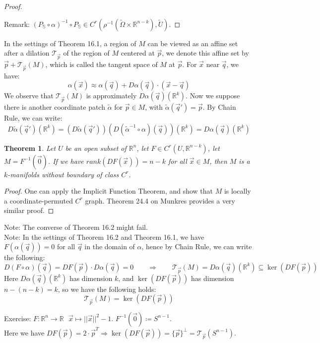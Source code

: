 \documentclass[15pt]{book}
\theoremstyle{break}
\theoremstyle{break}
\newtheorem{thm}{Theorem}[section]
\newcommand{\R}{\mathbb{R}}
\newcommand{\T}{\mathcal{T}}
\newcommand{\that}[1]{\widetilde{#1}}
\newcommand{\note}{\color{red}Note: \color{black}}
\newcommand{\remark}{\color{blue}Remark: \color{black}}
\newcommand{\exercise}{\color{green}Exercise: \color{black}}
\begin{document}
\begin{proof}
\begin{center}
\end{center}
\remark $(P_\mathbb{S} \circ \alpha)^{-1} \circ P_\mathbb{S} \in C^r(\rho^{-1}(\widetilde{\Omega}\times \R^{n-k} ),\widetilde{U})$.
\end{proof} 
 
In the settings of Theorem 16.1, a region of $M$ can be viewed as an affine set after a  dilation $\T_{\vec{p}}$ of the region of $M$ centered at $\vec{p}$, we denote this affine set by $\vec{p} + \T_{\vec{p}}(M)$, which is called the tangent space of $M$ at $\vec{p}$. For $\vec{x}$ near $\vec{q}$, we have:
$$\alpha(\vec{x}) \approx \alpha(\vec{q}) + D\alpha(\vec{q}) \cdot (\vec{x}-\vec{q})$$
We observe that $\T_{\vec{p}}(M)$ is approximately $D\alpha(\vec{q}) (\R^k)$. Now we suppose there is another coordinate patch $\that{\alpha}$ for $\vec{p}\in M$, with $\that{\alpha}(\vec{q}') = \vec{p}$. By Chain Rule, we can write:
$$D\that{\alpha}(\vec{q}')(\R^k) = (D\that{\alpha}(\vec{q}'))(D(\that{\alpha}^{-1}\circ \alpha )(\vec{q}))(\R^k) = D\alpha(\vec{q})(\R^k)$$

\begin{thm}
Let $U$ be an open subset of $\R^n$, let $F \in C^r(U,\R^{n-k})$, let $M = F^{-1}(\vec{0})$. 
If we have $rank(DF(\vec{x})) = n-k$ for all $\vec{x}\in M$, then $M$ is a $k$-manifolds without boundary of class $C^r$.
\end{thm}
\begin{proof}
One can apply the Implicit Function Theorem, and show that $M$ is locally a coordinate-permuted $C^r$ graph. Theorem 24.4 on Munkres provides a very similar proof.
\end{proof}

\note The converse of Theorem 16.2 might fail.\\

\note In the settings of Theorem 16.2 and Theorem 16.1, we have $F(\alpha(\vec{q})) = 0$ for all $\vec{q}$ in the domain of $\alpha$, hence by Chain Rule, we can write the following:
$$D(F\circ \alpha)(\vec{q}) = DF(\vec{p})\cdot D\alpha(\vec{q}) = 0 \qquad \Rightarrow \qquad \T_{\vec{p}}(M) = D\alpha(\vec{q})(\R^k) \subseteq \ker (DF(\vec{p}))$$
Here $D\alpha(\vec{q})(\R^k) $ has dimension $k$, and $\ker (DF(\vec{p}))$ has dimension $n-(n-k)= k$, so we have the following holds: 
$$\T_{\vec{p}}(M) = \ker (DF(\vec{p}))$$

\hfill\break
\exercise $F:\R^n \to \R \ \ \ \vec{x}\mapsto ||\vec{x}||^2 -1$. $F^{-1}(\vec{0})\coloneqq S^{n-1}$.\\
Here we have $DF(\vec{p}) = 2\cdot \vec{p}^T\Rightarrow \ker(DF(\vec{p})) = \{\vec{p}\}^\perp= \T_{\vec{p}}(S^{n-1})$.\\
\hfill\break
\end{document}
